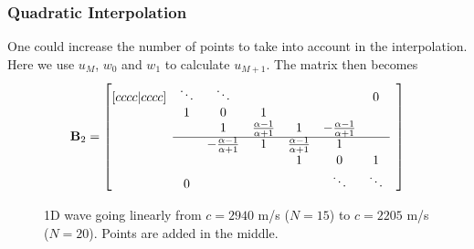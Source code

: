 \documentclass[dvipsnames]{article}
\begin{document}
\subsubsection{Quadratic Interpolation}
One could increase the number of points to take into account in the interpolation. Here we use $u_{M}$, $w_0$ and $w_1$ to calculate $u_{M+1}$. The matrix then becomes
\begin{equation}\label{eq:quadMat}
    \mathbf{B}_2 = \begin{bmatrix}[cccc|cccc]
     & \ddots  &\ddots & & & & 0 & \\
       & 1 & 0 & 1 & & & & \\
      & & 1 & \frac{\alpha - 1}{\alpha + 1} & 1 & -\frac{\alpha - 1}{\alpha + 1} & \\ \cline{2-7}
      & & -\frac{\alpha - 1}{\alpha + 1} & 1 & \frac{\alpha - 1}{\alpha + 1} & 1 & & \\
         & & & &1 & 0 & 1  \\
         & 0 & &  &  &\ddots & \ddots &
    \end{bmatrix}
\end{equation}
\begin{figure}[h]
    \centering
    \hspace{0.05\textwidth}
    \caption{1D wave going linearly from $c = 2940$ m/s ($N=15$) to $c =2205$ m/s ($N=20$). Points are added in the middle.}\label{fig:linAddInCenter}
\end{figure}
\end{document}

